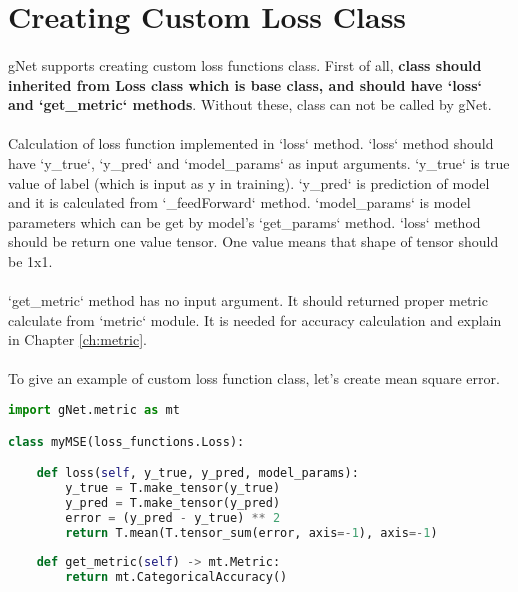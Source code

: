\documentclass[12pt]{report}
\begin{document}
\section{Creating Custom Loss Class}

\paragraph{}
gNet supports creating custom loss functions class. First of all, \textbf{class should inherited from Loss class which is base class, and should have `loss` and `get\_metric` methods}. Without these, class can not be called by gNet. 

\paragraph{}
Calculation of loss function implemented in `loss` method. `loss` method should have `y\_true`, `y\_pred` and `model\_params` as input arguments. `y\_true` is true value of label (which is input as y in training). `y\_pred` is prediction of model and it is calculated from `\_feedForward` method. `model\_params` is model parameters which can be get by model's `get\_params` method. `loss` method should be return one value tensor. One value means that shape of tensor should be 1x1.  

\paragraph{}
`get\_metric` method has no input argument. It should returned proper metric calculate from `metric` module. It is needed for accuracy calculation and explain in Chapter \ref{ch:metric}.

\paragraph{}
To give an example of custom loss function class, let's create mean square error. 


\begin{lstlisting}[language=Python, numbers=none, caption={Custom loss function class.}, label={lis:loss-custom-class}]
import gNet.metric as mt

class myMSE(loss_functions.Loss):

	def loss(self, y_true, y_pred, model_params):  
		y_true = T.make_tensor(y_true)
		y_pred = T.make_tensor(y_pred)
		error = (y_pred - y_true) ** 2
		return T.mean(T.tensor_sum(error, axis=-1), axis=-1)
	
	def get_metric(self) -> mt.Metric:
		return mt.CategoricalAccuracy()

\end{lstlisting}
\end{document}
